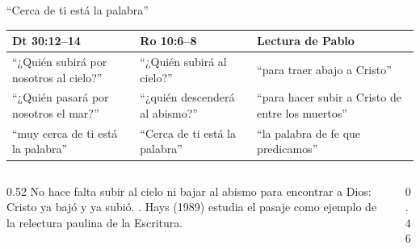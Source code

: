 \begin{frame}{``Cerca de ti está la palabra''}
\scriptsize\renewcommand{\arraystretch}{1.18}
\begin{tabular}{@{}>{\RaggedRight\arraybackslash}p{3.9cm}>{\RaggedRight\arraybackslash}p{3.7cm}>{\RaggedRight\arraybackslash}p{4.2cm}@{}}
\toprule
\textbf{Dt 30:12--14} & \textbf{Ro 10:6--8} & \textbf{Lectura de Pablo} \\ \midrule
``¿Quién subirá por nosotros al cielo?'' & ``¿Quién subirá al cielo?'' & ``para traer abajo a Cristo'' \\
``¿Quién pasará por nosotros el mar?'' & ``¿quién descenderá al abismo?'' & ``para hacer subir a Cristo de entre los muertos'' \\
``muy cerca de ti está la palabra'' & ``Cerca de ti está la palabra'' & ``la palabra de fe que predicamos'' \\
\bottomrule
\end{tabular}\par\medskip
\begin{columns}[t,onlytextwidth]
\begin{column}{0.52\textwidth}\small
No hace falta subir al cielo ni bajar al abismo para encontrar a Dios: Cristo ya bajó y ya subió. . Hays (1989) estudia el pasaje como ejemplo de la relectura paulina de la Escritura.
\end{column}
\begin{column}{0.46\textwidth}
\end{column}
\end{columns}
\end{frame}

